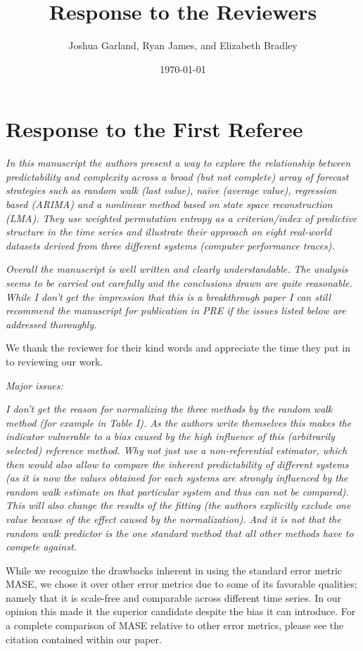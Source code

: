 \documentclass[12pt]{article}
\title{Response to the Reviewers}
\author{Joshua Garland, Ryan James, and Elizabeth Bradley}
\date{\today}
\begin{document}
\maketitle

\section*{Response to the First Referee}

\emph{In this manuscript the authors present a way to explore the relationship
between predictability and complexity across a broad (but not complete) array of
forecast strategies such as random walk (last value), na\"ive (average value),
regression based (ARIMA) and a nonlinear method based on state space
reconstruction (LMA). They use weighted permutation entropy as a criterion/index
of predictive structure in the time series and illustrate their approach on
eight real-world datasets derived from three different systems (computer
performance traces).}

\emph{Overall the manuscript is well written and clearly understandable. The
analysis seems to be carried out carefully and the conclusions drawn are quite
reasonable. While I don't get the impression that this is a breakthrough paper I
can still recommend the manuscript for publication in PRE if the issues listed
below are addressed thoroughly.}

We thank the reviewer for their kind words and appreciate the time they put in
to reviewing our work.

\noindent\emph{Major issues:}

\emph{I don't get the reason for normalizing the three methods by the random
walk method (for example in Table I). As the authors write themselves this makes
the indicator vulnerable to a bias caused by the high influence of this
(arbitrarily selected) reference method. Why not just use a non-referential
estimator, which then would also allow to compare the inherent predictability of
different systems (as it is now the values obtained for each systems are
strongly influenced by the random walk estimate on that particular system and
thus can not be compared). This will also change the results of the fitting (the
authors explicitly exclude one value because of the effect caused by the
normalization). And it is not that the random walk predictor is the one standard
method that all other methods have to compete against.}

While we recognize the drawbacks inherent in using the standard error metric
MASE, we chose it over other error metrics due to some of its favorable
qualities; namely that it is scale-free and comparable across different time
series. In our opinion this made it the superior candidate despite the bias it
can introduce. For a complete comparison of MASE relative to other error
metrics, please see the citation contained within our paper.
\end{document}
